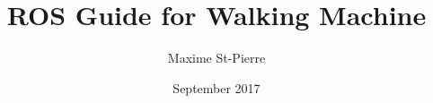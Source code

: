 \documentclass[a4paper,12pt]{book}
\begin{document}
\author{Maxime St-Pierre}
\title{ROS Guide for Walking Machine}
\date{September 2017}

\frontmatter
\maketitle
\tableofcontents

\mainmatter






\backmatter
			
\end{document}
